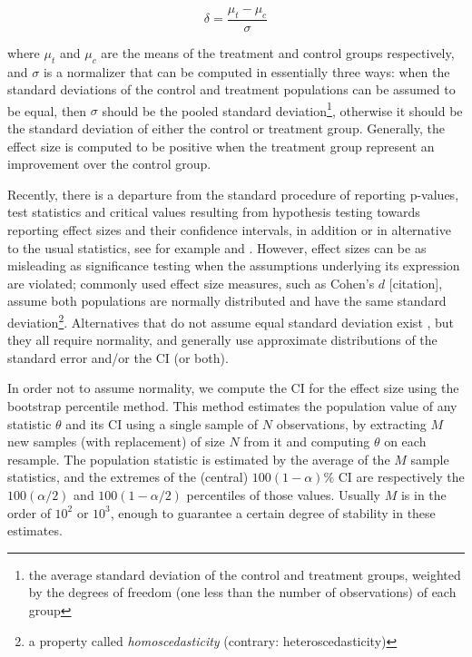 \documentclass[a4paper]{book}
\begin{document}
\begin{equation}
\label{eq:base_es}
\delta=\frac{\mu_t-\mu_c}{\sigma}
\end{equation}

\noindent where $\mu_t$ and $\mu_c$ are the means of the treatment and control groups respectively, and $\sigma$ is a normalizer that can be computed in essentially three ways: when the standard deviations of the control and treatment populations can be assumed to be equal, then $\sigma$ should be the pooled standard deviation\footnote{the average standard deviation of the control and treatment groups, weighted by the degrees of freedom (one less than the number of observations) of each group}, otherwise it should be the standard deviation of either the control or treatment group. Generally, the effect size is computed to be positive when the treatment group represent an improvement over the control group.

Recently, there is a departure from the standard procedure of reporting p-values, test statistics and critical values resulting from hypothesis testing towards reporting effect sizes and their confidence intervals, in addition or in alternative to the usual statistics, see for example \cite{apa} and \cite{aera}.  However, effect sizes can be as misleading as significance testing when the assumptions underlying its expression are violated; commonly used effect size measures, such as Cohen's $d$ [citation], assume both populations are normally distributed and have the same standard deviation\footnote{a property called \emph{homoscedasticity} (contrary: heteroscedasticity)}. Alternatives that do not assume equal standard deviation exist \citep{es1,es2,es3}, but they all require normality, and generally use approximate distributions of the standard error and/or the CI (or both).

In order not to assume normality, we compute the CI for the effect size using the bootstrap percentile method. This method estimates the population value of any statistic $\theta$ and its CI using a single sample of $N$ observations, by extracting $M$ new samples (with replacement) of size $N$ from it and computing $\theta$ on each resample. The population statistic is estimated by the average of the $M$ sample statistics, and the extremes of the (central) $100(1-\alpha)\%$ CI are respectively the $100(\alpha/2)$ and $100(1-\alpha/2)$ percentiles of those values. Usually $M$ is in the order of $10^2$ or $10^3$, enough to guarantee a certain degree of stability in these estimates.
\end{document}
